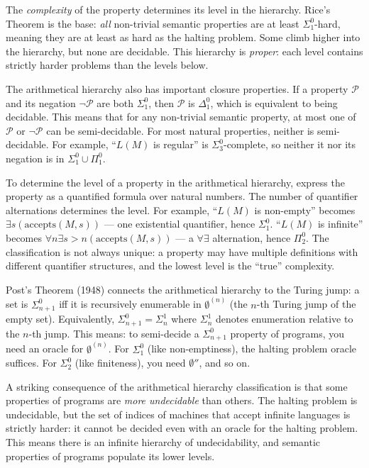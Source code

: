 The \emph{complexity} of the property determines its level in the hierarchy. Rice's Theorem is the base: \emph{all} non-trivial semantic properties are at least $\Sigma^0_1$-hard, meaning they are at least as hard as the halting problem. Some climb higher into the hierarchy, but none are decidable. This hierarchy is \emph{proper}: each level contains strictly harder problems than the levels below.

The arithmetical hierarchy also has important closure properties. If a property $\mathcal{P}$ and its negation $\neg\mathcal{P}$ are both $\Sigma^0_1$, then $\mathcal{P}$ is $\Delta^0_1$, which is equivalent to being decidable. This means that for any non-trivial semantic property, at most one of $\mathcal{P}$ or $\neg\mathcal{P}$ can be semi-decidable. For most natural properties, neither is semi-decidable. For example, ``$L(M)$ is regular'' is $\Sigma^0_3$-complete, so neither it nor its negation is in $\Sigma^0_1 \cup \Pi^0_1$.

To determine the level of a property in the arithmetical hierarchy, express the property as a quantified formula over natural numbers. The number of quantifier alternations determines the level. For example, ``$L(M)$ is non-empty'' becomes $\exists s (\text{accepts}(M, s))$ --- one existential quantifier, hence $\Sigma^0_1$. ``$L(M)$ is infinite'' becomes $\forall n \exists s > n (\text{accepts}(M, s))$ --- a $\forall\exists$ alternation, hence $\Pi^0_2$. The classification is not always unique: a property may have multiple definitions with different quantifier structures, and the lowest level is the ``true'' complexity.

Post's Theorem (1948) connects the arithmetical hierarchy to the Turing jump: a set is $\Sigma^0_{n+1}$ iff it is recursively enumerable in $\emptyset^{(n)}$ (the $n$-th Turing jump of the empty set). Equivalently, $\Sigma^0_{n+1} = \Sigma^1_n$ where $\Sigma^1_n$ denotes enumeration relative to the $n$-th jump. This means: to semi-decide a $\Sigma^0_{n+1}$ property of programs, you need an oracle for $\emptyset^{(n)}$. For $\Sigma^0_1$ (like non-emptiness), the halting problem oracle suffices. For $\Sigma^0_2$ (like finiteness), you need $\emptyset''$, and so on.

A striking consequence of the arithmetical hierarchy classification is that some properties of programs are \emph{more undecidable} than others. The halting problem is undecidable, but the set of indices of machines that accept infinite languages is strictly harder: it cannot be decided even with an oracle for the halting problem. This means there is an infinite hierarchy of undecidability, and semantic properties of programs populate its lower levels.

